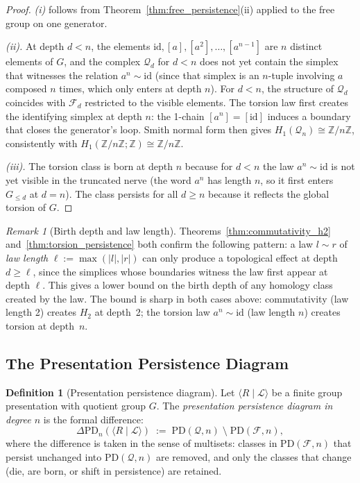 \documentclass{article}
\theoremstyle{definition}
\newtheorem{definition}[theorem]{Definition}
\theoremstyle{remark}
\newtheorem{remark}[theorem]{Remark}
\newcommand{\id}{\mathrm{id}}
\begin{document}
\begin{proof}
\textit{(i)} follows from Theorem~\ref{thm:free_persistence}(ii)
applied to the free group on one generator.

\textit{(ii).} At depth $d < n$, the elements
$\id, [a], [a^2], \dots, [a^{n-1}]$ are $n$ distinct elements of
$G$, and the complex $\mathcal{Q}_d$ for $d < n$ does not yet
contain the simplex that witnesses the relation $a^n \sim \id$
(since that simplex is an $n$-tuple involving $a$ composed $n$
times, which only enters at depth $n$). For $d < n$, the structure
of $\mathcal{Q}_d$ coincides with $\mathcal{F}_d$ restricted to
the visible elements. The torsion law first creates the identifying
simplex at depth $n$: the 1-chain $[a^n] = [\id]$ induces a
boundary that closes the generator's loop. Smith normal form then
gives $H_1(\mathcal{Q}_n) \cong \mathbb{Z}/n\mathbb{Z}$,
consistently with $H_1(\mathbb{Z}/n\mathbb{Z};\mathbb{Z}) \cong
\mathbb{Z}/n\mathbb{Z}$.

\textit{(iii).} The torsion class is born at depth $n$ because
for $d < n$ the law $a^n \sim \id$ is not yet visible in the
truncated nerve (the word $a^n$ has length $n$, so it first enters
$G_{\leq d}$ at $d = n$). The class persists for all $d \geq n$
because it reflects the global torsion of $G$.
\end{proof}

\begin{remark}[Birth depth and law length]
\label{rem:birthdepth}
Theorems~\ref{thm:commutativity_h2} and~\ref{thm:torsion_persistence}
both confirm the following pattern: a law $l \sim r$ of
\emph{law length} $\ell := \max(|l|, |r|)$ can only produce
a topological effect at depth $d \geq \ell$, since the simplices
whose boundaries witness the law first appear at depth $\ell$.
This gives a lower bound on the birth depth of any homology
class created by the law. The bound is sharp in both cases
above: commutativity (law length 2) creates $H_2$ at depth~2;
the torsion law $a^n \sim \id$ (law length $n$) creates torsion
at depth~$n$.
\end{remark}

\subsection{The Presentation Persistence Diagram}

\begin{definition}[Presentation persistence diagram]
\label{def:ppd}
Let $\langle R \mid \mathcal{L} \rangle$ be a finite group
presentation with quotient group $G$. The
\emph{presentation persistence diagram in degree $n$} is the
formal difference:
\[
  \Delta\mathrm{PD}_n(\langle R \mid \mathcal{L} \rangle)
  \;:=\;
  \mathrm{PD}(\mathcal{Q}, n) \;\setminus\; \mathrm{PD}(\mathcal{F}, n),
\]
where the difference is taken in the sense of multisets: classes
in $\mathrm{PD}(\mathcal{F}, n)$ that persist unchanged into
$\mathrm{PD}(\mathcal{Q}, n)$ are removed, and only the classes
that change (die, are born, or shift in persistence) are retained.
\end{definition}
\end{document}
